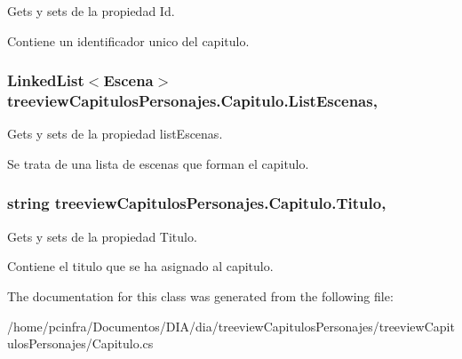 Gets y sets de la propiedad Id. 

Contiene un identificador unico del capitulo. \hypertarget{classtreeview_capitulos_personajes_1_1_capitulo_afc26428b68571633f8cb408807b70ab0}{
\subsubsection[{List\-Escenas}]{\setlength{\rightskip}{0pt plus 5cm}Linked\-List$<${\bf Escena}$>$ treeview\-Capitulos\-Personajes.\-Capitulo.\-List\-Escenas\hspace{0.3cm}{\ttfamily [get]}, {\ttfamily [set]}}}\label{classtreeview_capitulos_personajes_1_1_capitulo_afc26428b68571633f8cb408807b70ab0}


Gets y sets de la propiedad list\-Escenas. 

Se trata de una lista de escenas que forman el capitulo. \hypertarget{classtreeview_capitulos_personajes_1_1_capitulo_a330cbbce967bf8aabfc9c4eacd1d91d3}{
\subsubsection[{Titulo}]{\setlength{\rightskip}{0pt plus 5cm}string treeview\-Capitulos\-Personajes.\-Capitulo.\-Titulo\hspace{0.3cm}{\ttfamily [get]}, {\ttfamily [set]}}}\label{classtreeview_capitulos_personajes_1_1_capitulo_a330cbbce967bf8aabfc9c4eacd1d91d3}


Gets y sets de la propiedad Titulo. 

Contiene el titulo que se ha asignado al capitulo. 

The documentation for this class was generated from the following file\-:\begin{DoxyCompactItemize}
\item 
/home/pcinfra/\-Documentos/\-D\-I\-A/dia/treeview\-Capitulos\-Personajes/treeview\-Capitulos\-Personajes/Capitulo.\-cs\end{DoxyCompactItemize}
